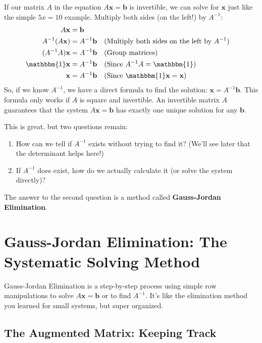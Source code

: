 \documentclass[11pt]{article}
\newcommand{\x}{\mathbf{x}}
\newcommand{\bb}{\mathbf{b}}
\newcommand{\id}{\mathbbm{1}}
\begin{document}
If our matrix $A$ in the equation $A\x = \bb$ is invertible, we can solve for $\x$ just like the simple $5x=10$ example. Multiply both sides (on the left!) by $A^{-1}$:
\begin{align*}
    A\x &= \bb \\
    A^{-1} (A\x) &= A^{-1} \bb && \text{(Multiply both sides on the left by } A^{-1} \text{)} \\
    (A^{-1} A) \x &= A^{-1} \bb && \text{(Group matrices)} \\
    \id \x &= A^{-1} \bb && \text{(Since } A^{-1}A = \id \text{)} \\
    \x &= A^{-1} \bb && \text{(Since } \id\x = \x \text{)}
\end{align*}
So, if we know $A^{-1}$, we have a direct formula to find the solution: $\x = A^{-1}\bb$. This formula only works if $A$ is square and invertible. An invertible matrix $A$ guarantees that the system $A\x=\bb$ has exactly one unique solution for any $\bb$.

This is great, but two questions remain:
\begin{enumerate}
    \item How can we tell if $A^{-1}$ exists without trying to find it? (We'll see later that the determinant helps here!)\
    \item If $A^{-1}$ does exist, how do we actually calculate it (or solve the system directly)?
\end{enumerate}

The answer to the second question is a method called \textbf{Gauss-Jordan Elimination}.

\section{Gauss-Jordan Elimination: The Systematic Solving Method}

Gauss-Jordan Elimination is a step-by-step process using simple row manipulations to solve $A\x = \bb$ or to find $A^{-1}$. It's like the elimination method you learned for small systems, but super organized.

\subsection{The Augmented Matrix: Keeping Track}
\end{document}
